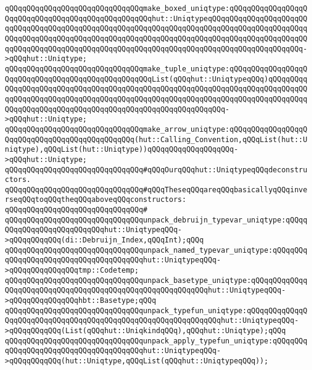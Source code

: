 \verb|qQQqqQQqqQQqqQQqqQQqqQQqqQQqqQQqmake_boxed_uniqtype:qQQqqQQqqQQqqQQqqQQqqQQqqQQqqQQqqQQqqQQqqQQqqQQqqQQqhut::UniqtypeqQQqqQQqqQQqqQQqqQQqqQQqqQQqqQQqqQQqqQQqqQQqqQQqqQQqqQQqqQQqqQQqqQQqqQQqqQQqqQQqqQQqqQQqqQQqqQQqqQQqqQQqqQQqqQQqqQQqqQQqqQQqqQQqqQQqqQQqqQQqqQQqqQQqqQQqqQQqqQQqqQQqqQQqqQQqqQQqqQQqqQQqqQQqqQQqqQQqqQQqqQQqqQQqqQQqqQQqqQQqqQQqqQQqqQQq->qQQqhut::Uniqtype;|\newline
\verb|qQQqqQQqqQQqqQQqqQQqqQQqqQQqqQQqmake_tuple_uniqtype:qQQqqQQqqQQqqQQqqQQqqQQqqQQqqQQqqQQqqQQqqQQqqQQqqQQqList(qQQqhut::UniqtypeqQQq)qQQqqQQqqQQqqQQqqQQqqQQqqQQqqQQqqQQqqQQqqQQqqQQqqQQqqQQqqQQqqQQqqQQqqQQqqQQqqQQqqQQqqQQqqQQqqQQqqQQqqQQqqQQqqQQqqQQqqQQqqQQqqQQqqQQqqQQqqQQqqQQqqQQqqQQqqQQqqQQqqQQqqQQqqQQqqQQqqQQqqQQqqQQqqQQqqQQqqQQq->qQQqhut::Uniqtype;|\newline
\verb|qQQqqQQqqQQqqQQqqQQqqQQqqQQqqQQqmake_arrow_uniqtype:qQQqqQQqqQQqqQQqqQQqqQQqqQQqqQQqqQQqqQQqqQQqqQQq(hut::Calling_Convention,qQQqList(hut::Uniqtype),qQQqList(hut::Uniqtype))qQQqqQQqqQQqqQQqqQQq->qQQqhut::Uniqtype;|\newline
\newline
\verb|qQQqqQQqqQQqqQQqqQQqqQQqqQQqqQQq#qQQqOurqQQqhut::UniqtypeqQQqdeconstructors.|\newline
\verb|qQQqqQQqqQQqqQQqqQQqqQQqqQQqqQQq#qQQqTheseqQQqareqQQqbasicallyqQQqinverseqQQqtoqQQqtheqQQqaboveqQQqconstructors:|\newline
\verb|qQQqqQQqqQQqqQQqqQQqqQQqqQQqqQQq#|\newline
\verb|qQQqqQQqqQQqqQQqqQQqqQQqqQQqqQQqunpack_debruijn_typevar_uniqtype:qQQqqQQqqQQqqQQqqQQqqQQqqQQqhut::UniqtypeqQQq->qQQqqQQqqQQq(di::Debruijn_Index,qQQqInt);qQQq|\newline
\verb|qQQqqQQqqQQqqQQqqQQqqQQqqQQqqQQqunpack_named_typevar_uniqtype:qQQqqQQqqQQqqQQqqQQqqQQqqQQqqQQqqQQqqQQqhut::UniqtypeqQQq->qQQqqQQqqQQqqQQqtmp::Codetemp;|\newline
\verb|qQQqqQQqqQQqqQQqqQQqqQQqqQQqqQQqunpack_basetype_uniqtype:qQQqqQQqqQQqqQQqqQQqqQQqqQQqqQQqqQQqqQQqqQQqqQQqqQQqqQQqqQQqhut::UniqtypeqQQq->qQQqqQQqqQQqqQQqhbt::Basetype;qQQq|\newline
\verb|qQQqqQQqqQQqqQQqqQQqqQQqqQQqqQQqunpack_typefun_uniqtype:qQQqqQQqqQQqqQQqqQQqqQQqqQQqqQQqqQQqqQQqqQQqqQQqqQQqqQQqqQQqqQQqhut::UniqtypeqQQq->qQQqqQQqqQQq(List(qQQqhut::UniqkindqQQq),qQQqhut::Uniqtype);qQQq|\newline
\verb|qQQqqQQqqQQqqQQqqQQqqQQqqQQqqQQqunpack_apply_typefun_uniqtype:qQQqqQQqqQQqqQQqqQQqqQQqqQQqqQQqqQQqqQQqhut::UniqtypeqQQq->qQQqqQQqqQQq(hut::Uniqtype,qQQqList(qQQqhut::UniqtypeqQQq));|\newline
